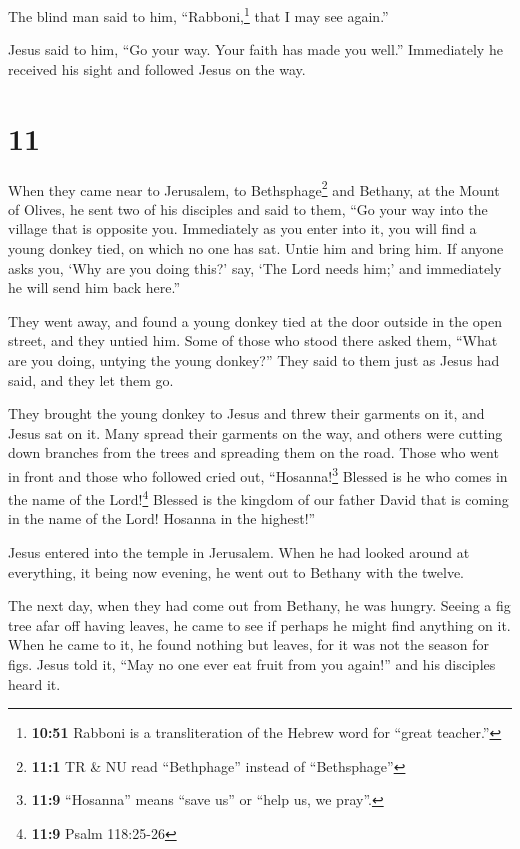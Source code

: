 The blind man said to him, ``Rabboni,\footnote{\textbf{10:51} Rabboni is
  a transliteration of the Hebrew word for ``great teacher.''} that I
may see again.''

 Jesus said to him, ``Go your way. Your faith has made
you well.'' Immediately he received his sight and followed Jesus on the
way.

\hypertarget{section-10}{%
\section{11}\label{section-10}}

 When they came near to Jerusalem, to
Bethsphage\footnote{\textbf{11:1} TR \& NU read ``Bethphage'' instead of
  ``Bethsphage''} and Bethany, at the Mount of Olives, he sent two of
his disciples  and said to them, ``Go your way into the
village that is opposite you. Immediately as you enter into it, you will
find a young donkey tied, on which no one has sat. Untie him and bring
him.  If anyone asks you, `Why are you doing this?' say,
`The Lord needs him;' and immediately he will send him back here.''

 They went away, and found a young donkey tied at the door
outside in the open street, and they untied him.  Some of
those who stood there asked them, ``What are you doing, untying the
young donkey?''  They said to them just as Jesus had said,
and they let them go.

 They brought the young donkey to Jesus and threw their
garments on it, and Jesus sat on it.  Many spread their
garments on the way, and others were cutting down branches from the
trees and spreading them on the road.  Those who went in
front and those who followed cried out, ``Hosanna!\footnote{\textbf{11:9}
  ``Hosanna'' means ``save us'' or ``help us, we pray''.} Blessed is he
who comes in the name of the Lord!\footnote{\textbf{11:9} Psalm
  118:25-26}  Blessed is the kingdom of our father David
that is coming in the name of the Lord! Hosanna in the highest!''

 Jesus entered into the temple in Jerusalem. When he had
looked around at everything, it being now evening, he went out to
Bethany with the twelve.

 The next day, when they had come out from Bethany, he
was hungry.  Seeing a fig tree afar off having leaves, he
came to see if perhaps he might find anything on it. When he came to it,
he found nothing but leaves, for it was not the season for figs.
 Jesus told it, ``May no one ever eat fruit from you
again!'' and his disciples heard it.

